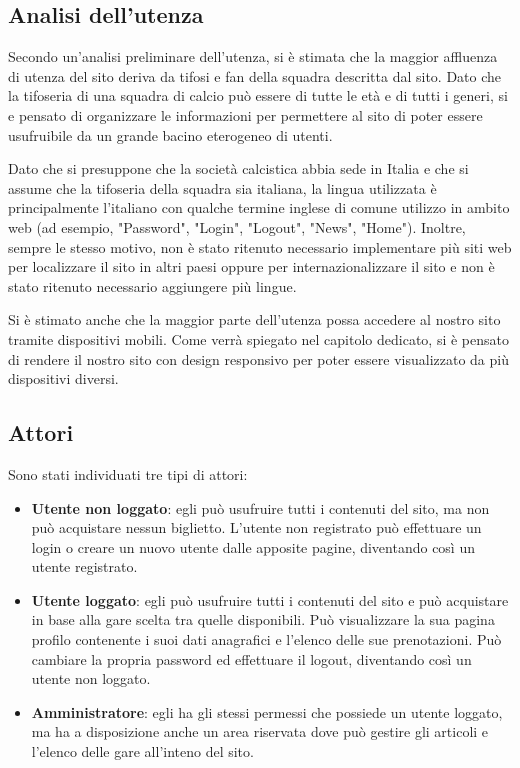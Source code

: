 \documentclass[12pt, a4paper]{article}
\begin{document}
\subsection{Analisi dell'utenza}
Secondo un'analisi preliminare dell'utenza, si è stimata che la maggior affluenza di utenza del sito deriva da tifosi e fan della squadra descritta dal sito. Dato che la tifoseria di una squadra di calcio può essere di tutte le età e di tutti i generi, si e pensato di organizzare le informazioni
per permettere al sito di poter essere usufruibile da un grande bacino eterogeneo di utenti.\par
Dato che si presuppone che la società calcistica abbia sede in Italia e che si assume che la tifoseria della squadra sia italiana, la lingua utilizzata è principalmente l'italiano con qualche termine inglese di comune utilizzo in ambito web (ad esempio, "Password", "Login", "Logout", "News", "Home").
Inoltre, sempre le stesso motivo, non è stato ritenuto necessario implementare più siti web per localizzare il sito in altri paesi oppure per internazionalizzare il sito e non è stato ritenuto necessario aggiungere più lingue.\par
Si è stimato anche che la maggior parte dell'utenza possa accedere al nostro sito tramite dispositivi mobili. Come verrà spiegato nel capitolo dedicato, si è pensato di rendere il nostro sito con design responsivo per poter essere visualizzato da più dispositivi diversi.

\subsection{Attori}
Sono stati individuati tre tipi di attori:

\begin{itemize}
	\item \textbf{Utente non loggato}: egli può usufruire tutti i contenuti del sito, ma non può acquistare nessun biglietto. L'utente non registrato può effettuare un login o creare un nuovo utente dalle apposite pagine, diventando così un utente registrato.
	\item \textbf{Utente loggato}: egli può usufruire tutti i contenuti del sito e può acquistare in base alla gare scelta tra quelle disponibili. Può visualizzare la sua pagina profilo contenente i suoi dati anagrafici e l'elenco delle sue prenotazioni. Può cambiare la propria password ed effettuare il logout, diventando così un utente non loggato.
	\item \textbf{Amministratore}: egli ha gli stessi permessi che possiede un utente loggato, ma ha a disposizione anche un area riservata dove può gestire gli articoli e l'elenco delle gare all'inteno del sito.
\end{itemize}
\end{document}
